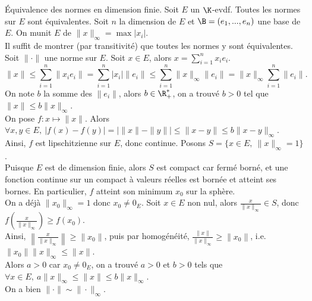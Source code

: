 \documentclass[11pt]{article}
\begin{document}
\begin{thm}{Équivalence des normes en dimension finie.}{}
    Soit $E$ un $\K$-evdf. Toutes les normes sur $E$ sont équivalentes.
    \tcblower
    Soit $n$ la dimension de $E$ et $\B=(e_1,...,e_n)$ une base de $E$. On munit $E$ de $\|x\|_\infty = \max|x_i|$.\\
    Il suffit de montrer (par transitivité) que toutes les normes y sont équivalentes.\\
    Soit $\|\cdot\|$ une norme sur $E$. Soit $x\in E$, alors $x=\sum_{i=1}^nx_ie_i$.
    \begin{equation*}
        \|x\| \leq \sum_{i=1}^n\|x_ie_i\| = \sum_{i=1}^n|x_i|\|e_i\|\leq\sum_{i=1}^n\|x\|_\infty\|e_i\|=\|x\|_\infty\sum_{i=1}^n\|e_i\|.
    \end{equation*}
    On note $b$ la somme des $\|e_i\|$, alors $b\in\R_+^*$, on a trouvé $b>0$ tel que $\|x\|\leq b\|x\|_\infty$.\\
    On pose $f:x\mapsto\|x\|$. Alors $\forall x,y\in E, ~ |f(x)-f(y)|=|\|x\|-\|y\||\leq\|x-y\|\leq b\|x-y\|_\infty$.\\
    Ainsi, $f$ est lipschitzienne sur $E$, donc continue. Posons $S=\{x\in E, ~ \|x\|_\infty = 1\}$. \\
    Puisque $E$ est de dimension finie, alors $S$ est compact car fermé borné, et une fonction continue sur un compact à valeurs réelles est bornée et atteint ses bornes. En particulier, $f$ atteint son minimum $x_0$ sur la sphère.\\
    On a déjà $\|x_0\|_\infty = 1$ donc $x_0\neq0_E$. Soit $x\in E$ non nul, alors $\frac{x}{\|x\|_\infty}\in S$, donc $f\left( \frac{x}{\|x\|_\infty} \right)\geq f(x_0)$.\\
    Ainsi, $\left\|\frac{x}{\|x\|_\infty}\right\|\geq\|x_0\|$, puis par homogénéité, $\frac{\|x\|}{\|x\|_\infty}\geq\|x_0\|$, i.e. $\|x_0\|\|x\|_\infty\leq\|x\|$.\\
    Alors $a>0$ car $x_0\neq0_E$, on a trouvé $a>0$ et $b>0$ tels que $\forall x \in E, ~ a\|x\|_\infty\leq\|x\|\leq b\|x\|_\infty$.\\
    On a bien $\|\cdot\|\sim\|\cdot\|_\infty$.
\end{thm}

\pagebreak
\end{document}

